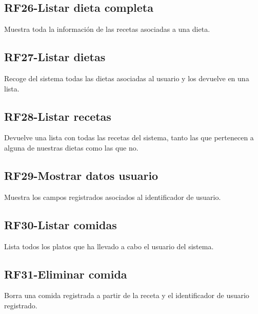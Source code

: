 \documentclass[a4paper,12pt]{report}
\begin{document}
\subsection{\textbf{RF26-Listar dieta completa}}
\label{sec-2-2-26}
Muestra toda la información de las recetas asociadas a una dieta.
\subsection{\textbf{RF27-Listar dietas}}
\label{sec-2-2-27}
Recoge del sistema todas las dietas asociadas al usuario y los devuelve en una lista.
\subsection{\textbf{RF28-Listar recetas}}
\label{sec-2-2-28}
Devuelve una lista con todas las recetas del sistema, tanto las que pertenecen a alguna de nuestras dietas como las que no.
\subsection{\textbf{RF29-Mostrar datos usuario}}
\label{sec-2-2-29}
Muestra los campos registrados asociados al identificador de usuario.
\subsection{\textbf{RF30-Listar comidas}}
\label{sec-2-2-30}
Lista todos los platos que ha llevado a cabo el usuario del sistema.
\subsection{\textbf{RF31-Eliminar comida}}
\label{sec-2-2-31}
Borra una comida registrada a partir de la receta y el identificador de usuario registrado.
\end{document}
